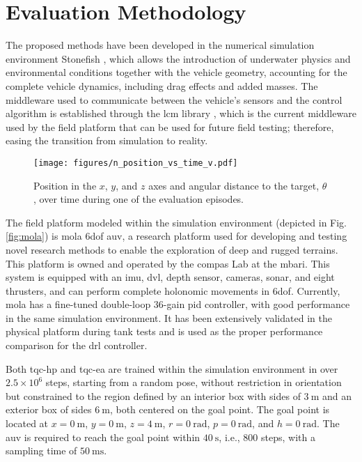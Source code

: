 \section{Evaluation Methodology}
\label{sec:metodology}

The proposed methods have been developed in the numerical simulation environment Stonefish  \cite{cieslak2019}, which allows the introduction of underwater physics and environmental conditions together with the vehicle geometry, accounting for the complete vehicle dynamics, including drag effects and added masses. The middleware used to communicate between the vehicle's sensors and the control algorithm is established through the \ac{lcm} library \cite{LCM}, which is the current middleware used by the field platform that can be used for future field testing; therefore, easing the transition from simulation to reality.

\begin{figure}[t!]
\centering
\texttt{[image: figures/n\_position\_vs\_time\_v.pdf]}%
\caption{Position in the $x$, $y$, and $z$ axes and angular distance to the target, $\theta$, over time during one of the evaluation episodes.}
\label{fig:position_vs_time}
\end{figure}

The field platform modeled within the simulation environment (depicted in Fig. \ref{fig:mola}) is \ac{mola} \ac{6dof} \ac{auv}, a research platform used for developing and testing novel research methods to enable the exploration of deep and rugged terrains. This platform is owned and operated by the \acs{compas} Lab at the \acf{mbari}. This system is equipped with an \ac{imu}, \ac{dvl}, depth sensor, cameras, sonar, and eight thrusters, and can perform complete holonomic movements in \ac{6dof}. Currently, \ac{mola} has a fine-tuned double-loop 36-gain \ac{pid} controller, with good performance in the same simulation environment. It has been extensively validated in the physical platform during tank tests and is used as the proper performance comparison for the \ac{drl} controller.

Both \ac{tqc-hp} and \ac{tqc-ea} are trained within the simulation environment in over $2.5\times10^6$ steps, starting from a random pose, without restriction in orientation but constrained to the region defined by an interior box with sides of $\SI{3}{\meter}$ and an exterior box of sides $\SI{6}{\meter}$, both centered on the goal point. The goal point is located at $x = \SI{0}{\meter}$, $y = \SI{0}{\meter}$, $z = \SI{4}{\meter}$, $r = \SI{0}{\radian}$, $p = \SI{0}{\radian}$, and $h = \SI{0}{\radian}$. The \ac{auv} is required to reach the goal point within $\SI{40}{\second}$, i.e., 800 steps, with a sampling time of $\SI{50}{\milli\second}$. 

